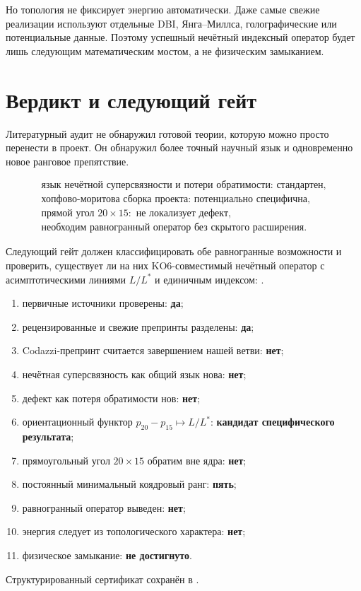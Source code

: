 Но топология не фиксирует энергию автоматически. Даже самые свежие
реализации используют отдельные DBI, Янга--Миллса, голографические или
потенциальные данные. Поэтому успешный нечётный индексный оператор будет
лишь следующим математическим мостом, а не физическим замыканием.

\section{Вердикт и следующий гейт}

Литературный аудит не обнаружил готовой теории, которую можно просто
перенести в проект. Он обнаружил более точный научный язык и одновременно
новое ранговое препятствие.

\begin{equation}
 \boxed{
 \begin{gathered}
 \text{язык нечётной суперсвязности и потери обратимости: стандартен},\\
 \text{хопфово-моритова сборка проекта: потенциально специфична},\\
 \text{прямой угол }20\times15:\text{ не локализует дефект},\\
 \text{необходим равногранный оператор без скрытого расширения}.
 \end{gathered}}
\end{equation}

Следующий гейт должен классифицировать обе равногранные возможности и
проверить, существует ли на них KO6-совместимый нечётный оператор с
асимптотическими линиями $L/L^*$ и единичным индексом:
.

\begin{protocol}
\begin{enumerate}
 \item первичные источники проверены: \textbf{да};
 \item рецензированные и свежие препринты разделены: \textbf{да};
 \item Codazzi-препринт считается завершением нашей ветви: \textbf{нет};
 \item нечётная суперсвязность как общий язык нова: \textbf{нет};
 \item дефект как потеря обратимости нов: \textbf{нет};
 \item ориентационный функтор $p_{20}-p_{15}\mapsto L/L^*$:
 \textbf{кандидат специфического результата};
 \item прямоугольный угол $20\times15$ обратим вне ядра: \textbf{нет};
 \item постоянный минимальный коядровый ранг: \textbf{пять};
 \item равногранный оператор выведен: \textbf{нет};
 \item энергия следует из топологического характера: \textbf{нет};
 \item физическое замыкание: \textbf{не достигнуто}.
\end{enumerate}
\end{protocol}

Структурированный сертификат сохранён в
.